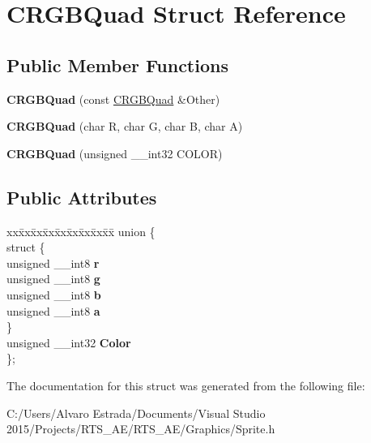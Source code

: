 \hypertarget{struct_c_r_g_b_quad}{}\section{C\+R\+G\+B\+Quad Struct Reference}
\label{struct_c_r_g_b_quad}
\subsection*{Public Member Functions}
\begin{DoxyCompactItemize}
\item 
{\bfseries C\+R\+G\+B\+Quad} (const \hyperlink{struct_c_r_g_b_quad}{C\+R\+G\+B\+Quad} \&Other)\hypertarget{struct_c_r_g_b_quad_ab3f7a42656a58e55c44d465b200ab6df}{}\label{struct_c_r_g_b_quad_ab3f7a42656a58e55c44d465b200ab6df}

\item 
{\bfseries C\+R\+G\+B\+Quad} (char R, char G, char B, char A)\hypertarget{struct_c_r_g_b_quad_a294c3ad7f6f14a2919873174e971949d}{}\label{struct_c_r_g_b_quad_a294c3ad7f6f14a2919873174e971949d}

\item 
{\bfseries C\+R\+G\+B\+Quad} (unsigned \+\_\+\+\_\+int32 C\+O\+L\+OR)\hypertarget{struct_c_r_g_b_quad_a7dc4fae8f08fd2131d8fc46c4d0f5cc1}{}\label{struct_c_r_g_b_quad_a7dc4fae8f08fd2131d8fc46c4d0f5cc1}

\end{DoxyCompactItemize}
\subsection*{Public Attributes}
\begin{DoxyCompactItemize}
\item 
\begin{tabbing}
xx\=xx\=xx\=xx\=xx\=xx\=xx\=xx\=xx\=\kill
union \{\\
\>struct \{\\
\>\>unsigned \_\_int8 {\bfseries r}\\
\>\>unsigned \_\_int8 {\bfseries g}\\
\>\>unsigned \_\_int8 {\bfseries b}\\
\>\>unsigned \_\_int8 {\bfseries a}\\
\>\} \hypertarget{union_c_r_g_b_quad_1_1_0D12_ad03d3a91062c7666a7ba3281181c1ac3}{}\label{union_c_r_g_b_quad_1_1_0D12_ad03d3a91062c7666a7ba3281181c1ac3}
\\
\>unsigned \_\_int32 {\bfseries Color}\\
\}; \hypertarget{struct_c_r_g_b_quad_ab43540c348950cdb14234a34e31e8817}{}\label{struct_c_r_g_b_quad_ab43540c348950cdb14234a34e31e8817}
\\

\end{tabbing}\end{DoxyCompactItemize}


The documentation for this struct was generated from the following file\+:\begin{DoxyCompactItemize}
\item 
C\+:/\+Users/\+Alvaro Estrada/\+Documents/\+Visual Studio 2015/\+Projects/\+R\+T\+S\+\_\+\+A\+E/\+R\+T\+S\+\_\+\+A\+E/\+Graphics/Sprite.\+h\end{DoxyCompactItemize}

